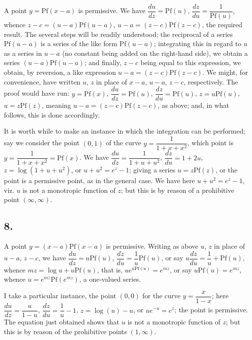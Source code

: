 \documentclass[11pt,a4paper]{book}
\providecommand{\Pf}{\mathrm{Pf}}
\begin{document}
A point $y = \Pf(x - a)$ is permissive. We have $\dfrac{du}{dz} = \Pf(u)$, $\dfrac{dz}{du} = \dfrac{1}{\Pf(u)}$, whence $z - c = (u - a)\Pf(u - a)$, $u - a = (z - c)\Pf(z - c)$, the required result. The several steps will be readily understood; the reciprocal of a series $\Pf(u - a)$ is a series of the like form $\Pf(u - a)$; integrating this in regard to $u$ as a series in $u - a$ (no constant being added on the right-hand side), we obtain a series $(u - a)\Pf(u - a)$; and finally, $z - c$ being equal to this expression, we obtain, by reversion, a like expression $u - a = (z - c)\Pf(z - c)$. We might, for convenience, have written $u$, $z$ in place of $x - a$, $u - a$, $z - c$, respectively. The proof would have run: $y = \Pf(x)$, $\dfrac{du}{dz} = \Pf(u)$, $\dfrac{dz}{du} = \Pf(u)$, $z = u\Pf(u)$, $u = z\Pf(z)$, meaning $u - a = (z - c)\Pf(z - c)$, as above; and, in what follows, this is done accordingly.

It is worth while to make an instance in which the integration can be performed; say we consider the point $(0, 1)$ of the curve $y = \dfrac{1}{1 + x + x^2}$, which point is $y = \dfrac{1}{1 + x + x^2} = \Pf(x)$. We have $\dfrac{du}{dz} = \dfrac{1}{1 + u + u^2}$, $\dfrac{dz}{du} = 1 + 2u$, $z = \log(1 + u + u^2)$, or $u + u^2 = e^z - 1$; giving a series $u = z\Pf(z)$, or the point is a permissive point, as in the general case. We have here $u + u^2 = e^z - 1$, viz. $u$ is not a monotropic function of $z$; but this is by reason of a prohibitive point $(\infty, \infty)$.

\subsection*{8.}

A point $y = (x - a)\Pf(x - a)$ is permissive. Writing as above $u$, $z$ in place of $u - a$, $z - c$, we have $\dfrac{du}{dz} = u\Pf(u)$, $\dfrac{dz}{du} = \dfrac{1}{u}\Pf(u)$, or say $u\dfrac{dz}{du} = \dfrac{1}{u} + \Pf(u)$, whence $mz = \log u + u\Pf(u)$, that is, $ue^{u\Pf(u)} = e^{mz}$, or say $u\Pf(u) = e^{mz}$, whence $u = e^{mz}\Pf(e^{mz})$, a one-valued series.

I take a particular instance, the point $(0, 0)$ for the curve $y = \dfrac{x}{1 - x}$; here $\dfrac{du}{dz} = \dfrac{u}{1 - u}$, $\dfrac{dz}{du} = \dfrac{1}{u} - 1$, $z = \log(u) - u$, or $ue^{-u} = e^z$; the point is permissive. The equation just obtained shows that $u$ is not a monotropic function of $z$; but this is by reason of the prohibitive points $(1, \infty)$.
\end{document}
